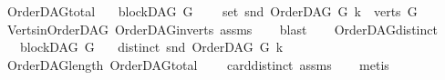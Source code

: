 \begin{isabellebody}
%
\endisatagproof
{\isafoldproof}%
%
\isadelimproof
\isanewline
%
\endisadelimproof
\isanewline
{}\isamarkupfalse%
\ OrderDAG{\isacharunderscore}{\kern0pt}total{\isacharcolon}{\kern0pt}\isanewline
\ \ \ {\isachardoublequoteopen}blockDAG\ G{\isachardoublequoteclose}\ \isanewline
\ \ \ {\isachardoublequoteopen}set\ {\isacharparenleft}{\kern0pt}snd\ {\isacharparenleft}{\kern0pt}OrderDAG\ G\ k{\isacharparenright}{\kern0pt}{\isacharparenright}{\kern0pt}\ {\isacharequal}{\kern0pt}\ verts\ G{\isachardoublequoteclose}\isanewline
%
\isadelimproof
\ \ %
\endisadelimproof
%
\isatagproof
{}\isamarkupfalse%
\ Verts{\isacharunderscore}{\kern0pt}in{\isacharunderscore}{\kern0pt}OrderDAG\ OrderDAG{\isacharunderscore}{\kern0pt}in{\isacharunderscore}{\kern0pt}verts\ assms{\isacharparenleft}{\kern0pt}{}{\isacharparenright}{\kern0pt}\isanewline
\ \ \isamarkupfalse%
\ blast%
\endisatagproof
{\isafoldproof}%
%
\isadelimproof
\ \isanewline
%
\endisadelimproof
\isanewline
{}\isamarkupfalse%
\ \ OrderDAG{\isacharunderscore}{\kern0pt}distinct{\isacharcolon}{\kern0pt}\isanewline
\ \ \ {\isachardoublequoteopen}blockDAG\ G{\isachardoublequoteclose}\isanewline
\ \ \ {\isachardoublequoteopen}distinct\ {\isacharparenleft}{\kern0pt}snd\ {\isacharparenleft}{\kern0pt}OrderDAG\ G\ k{\isacharparenright}{\kern0pt}{\isacharparenright}{\kern0pt}{\isachardoublequoteclose}\isanewline
%
\isadelimproof
\ \ %
\endisadelimproof
%
\isatagproof
{}\isamarkupfalse%
\ OrderDAG{\isacharunderscore}{\kern0pt}length\ OrderDAG{\isacharunderscore}{\kern0pt}total\isanewline
\ \ \ \ card{\isacharunderscore}{\kern0pt}distinct\ assms\isanewline
\ \ \isamarkupfalse%
\ metis%
\endisatagproof
{\isafoldproof}%
%
\isadelimproof
\ \isanewline
%
\endisadelimproof
\ \ \ \ \isanewline
%
\isadelimtheory
%
\endisadelimtheory
%
\isatagtheory
{}\isamarkupfalse%
%
\endisatagtheory
{\isafoldtheory}%
%
\isadelimtheory
%
\endisadelimtheory
%
\end{isabellebody}%
\endinput
